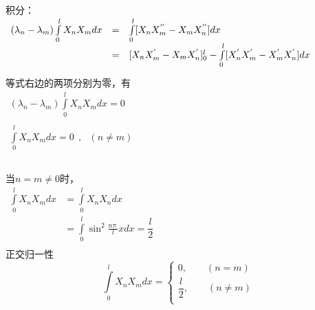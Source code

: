 \begin{frame}
	\frametitle{}	
	积分：\\
	$ \begin{array}{llll}
		(\lambda_n-\lambda_m) \int\limits_{0 }^{l}  X_n X_m dx &= & \int\limits_{0 }^{l}  [X_nX_m ^{''}-X_mX_n ^{''} ] dx\\   \vspace{0.3cm}
		&=&  [X_nX_m ^{'}-X_mX_n ^{'} ]_0 ^{l} - \int\limits_{0 }^{l}  [X_n ^{'} X_m ^{'}-X_m ^{'} X_n ^{'} ] dx \\   
	\end{array}$ \\
	等式右边的两项分别为零，有\\
	$ \begin{array}{llll}
		(\lambda_n-\lambda_m) \int\limits_{0 }^{l}  X_n X_m dx=0 \\   
	\end{array}$ \\
	$ \begin{array}{llll}
		\int\limits_{0 }^{l}  X_n X_m dx=0 ~~,~~~ (n\ne m)\\   
	\end{array}$ 
\end{frame}	

\begin{frame}
	\frametitle{}	
	当$n= m \ne 0$时， \\   
	$ \begin{array}{llll}
		\int\limits_{0 }^{l}  X_n X_m dx&= \int\limits_{0 }^{l}  X_n X_n dx \\
		&= \int\limits_{0 }^{l}   \sin ^2  \frac{n\pi~}{l} x dx =  \dfrac{l}{2} \\
	\end{array}$ \\
    正交归一性
    \begin{equation*}
        \int\limits_{0 }^{l}  X_n X_m dx =
        \begin{cases}
         0, \qquad (n=m) \\ 
         \dfrac{l}{2} , \qquad (n \not =m) \\ 
        \end{cases} 
    \end{equation*} 
\end{frame}	

